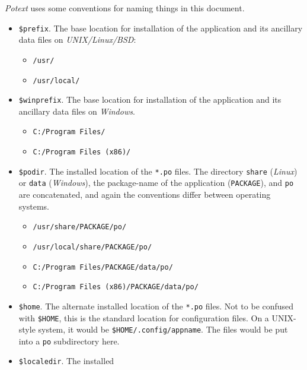 \documentclass[
 11pt,
 twoside,
 a4paper,
 final                                 %
]{article}
\begin{document}
   \textsl{Potext} uses some conventions for naming things in this
   document.

   \begin{itemize}
      \item \texttt{\$prefix}. The base location for installation of
         the application and its ancillary data files on
         \textsl{UNIX/Linux/BSD}:
         \begin{itemize}
            \item \texttt{/usr/}
            \item \texttt{/usr/local/}
         \end{itemize}
      \item \texttt{\$winprefix}. The base location for installation of
         the application and its ancillary data files on \textsl{Windows}.
         \begin{itemize}
            \item \texttt{C:/Program Files/}
            \item \texttt{C:/Program Files (x86)/}
         \end{itemize}
      \item \texttt{\$podir}. The installed location of the \texttt{*.po}
         files.  The directory \texttt{share} (\textsl{Linux}) or
         \texttt{data} (\textsl{Windows}),
         the package-name of the application
         (\texttt{PACKAGE}), and \texttt{po} are concatenated,
         and again the conventions differ between operating systems.
         \begin{itemize}
            \item \texttt{/usr/share/PACKAGE/po/}
            \item \texttt{/usr/local/share/PACKAGE/po/}
            \item \texttt{C:/Program Files/PACKAGE/data/po/}
            \item \texttt{C:/Program Files (x86)/PACKAGE/data/po/}
         \end{itemize}
      \item \texttt{\$home}. The alternate installed
         location of the \texttt{*.po} files.
         Not to be confused with \texttt{\$HOME}, this is
         the standard location for configuration files.
         On a UNIX-style system, it would be \linebreak
         \texttt{\$HOME/.config/appname}.
         The files would be put into a \texttt{po} subdirectory here.
      \item \texttt{\$localedir}. The installed

\end{itemize}
\end{document}
